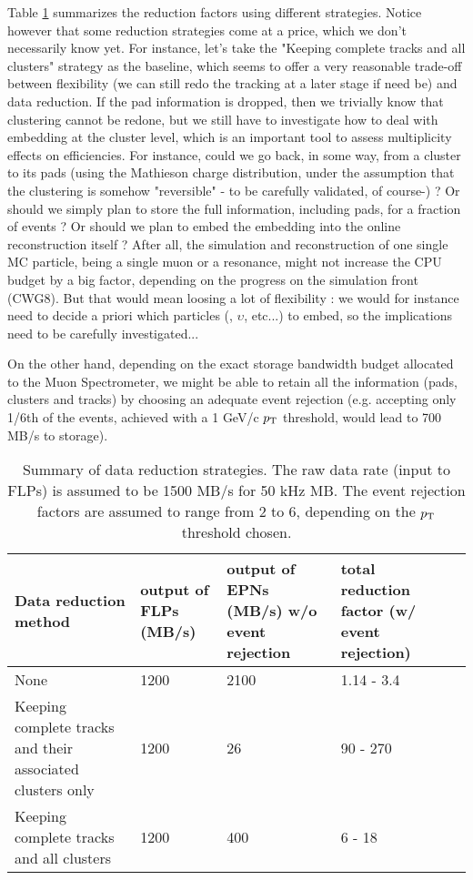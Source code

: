 Table \ref{tab:data reduction values} summarizes the reduction factors using different strategies. Notice however that some reduction strategies come at a price, which we don't  necessarily know yet. For instance, let's take the "Keeping complete tracks and all clusters" strategy as the baseline, which seems to offer a very reasonable trade-off between flexibility (we can still redo the tracking at a later stage if need be) and data reduction. If the pad information is dropped, then we trivially know that clustering cannot be redone, but we still have to investigate how to deal with embedding at the cluster level, which is an important tool to assess multiplicity effects on efficiencies. For instance, could we go back, in some way, from a cluster to its pads (using the Mathieson charge distribution, under the assumption that the clustering is somehow "reversible" - to be carefully validated, of course-) ? Or should we simply plan to store the full information, including pads, for a fraction of events ? Or should we plan to embed the embedding into the online reconstruction itself ? After all, the simulation and reconstruction of one single MC particle, being a single muon or a resonance, might not increase the CPU budget by a big factor, depending on the progress on the simulation front (CWG8). But that would mean loosing a lot of flexibility : we would for instance need to decide a priori which particles (\jpsi, $\upsilon$, etc...) to embed, so the implications need to be carefully investigated...

On the other hand, depending on the exact storage bandwidth budget allocated to the Muon Spectrometer, we might be able to retain all the information (pads, clusters and tracks) by choosing an adequate event rejection (e.g. accepting only 1/6th of the events, achieved with a 1 GeV/c $p_{\rm{T}}$ threshold, would lead to 700 MB/s to storage).

\begin{table}
\centering
\begin{tabular}{|p{4cm}|p{3cm}|p{3cm}|p{3cm}|p{3cm}|}
\hline
Data reduction method & output of FLPs (MB/s) & output of EPNs (MB/s) w/o event rejection & total reduction factor (w/ event rejection) \\
\hline
\hline
None & 1200 &  2100 & 1.14 - 3.4  \\
\hline
Keeping complete tracks and their associated clusters only & 1200 & 26 & 90 - 270 \\
\hline
Keeping complete tracks and all clusters &  1200 & 400 & 6 -  18 \\
\hline
\end{tabular}
\caption{\label{tab:data reduction values}Summary of data reduction strategies. The raw data rate (input to FLPs) is assumed to be 1500 MB/s for 50 kHz MB. The event rejection factors are assumed to range from 2 to 6, depending on the $p_{\rm{T}}$ threshold chosen.}
\end{table}
